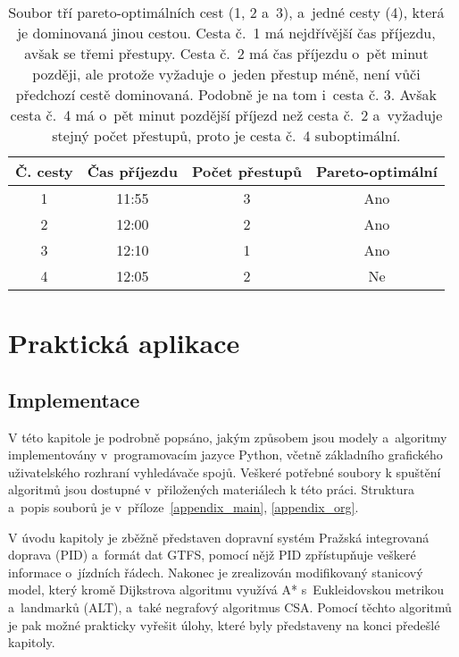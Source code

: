 \begin{description}
	\begin{table}[h]
		\centering
		\begin{tabular}{cccc}
			\toprule
			\textbf{Č. cesty} & \textbf{Čas příjezdu} & \textbf{Počet přestupů} & \textbf{Pareto-optimální} \\
			\midrule
			1 & 11:55 & 3  & Ano \\
			2 & 12:00 & 2  & Ano \\
			3 & 12:10 & 1  & Ano \\
			4 & 12:05 & 2  & Ne  \\
			\bottomrule
		\end{tabular}
		\caption[Příklad pareto-optimálních cest]{Soubor tří pareto-optimálních cest (1, 2 a~3), a~jedné cesty (4), která je dominovaná jinou cestou. Cesta č.~1 má nejdřívější čas příjezdu, avšak se třemi přestupy. Cesta č.~2 má čas příjezdu o~pět minut později, ale protože vyžaduje o~jeden přestup méně, není vůči předchozí cestě dominovaná. Podobně je na tom i~cesta č. 3. Avšak cesta č.~4 má o~pět minut pozdější příjezd než cesta č.~2 a~vyžaduje stejný počet přestupů, proto je cesta č.~4 suboptimální.}
		\label{tab:pareto-example}
	\end{table}
\end{description}

\part{Praktická aplikace}
\chapter{Implementace}
\label{implementace}
\renewcommand{\sectionautorefname}{oddíl}
V této kapitole je podrobně popsáno, jakým způsobem jsou modely a~algoritmy implementovány v~programovacím jazyce Python, včetně základního grafického uživatelského rozhraní vyhledávače spojů. Veškeré potřebné soubory k spuštění algoritmů jsou dostupné v~přiložených materiálech k této práci. Struktura a~popis souborů je v~příloze~\ref{appendix_main}, \autoref{appendix_org}.
\renewcommand{\sectionautorefname}{oddíle}

V úvodu kapitoly je zběžně představen dopravní systém Pražská integrovaná doprava (PID) a~formát dat GTFS, pomocí nějž PID zpřístupňuje veškeré informace o~jízdních řádech. Nakonec je zrealizován modifikovaný stanicový model, který kromě Dijkstrova algoritmu využívá A* s~Eukleidovskou metrikou a~landmarků (ALT), a~také negrafový algoritmus CSA. Pomocí těchto algoritmů je pak možné prakticky vyřešit úlohy, které byly představeny na konci předešlé kapitoly.

